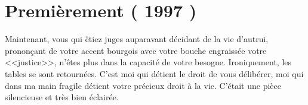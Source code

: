 \documentclass{article}
\begin{document}
    \section*{Premièrement ( 1997 ) }
        Maintenant, vous qui êtiez juges auparavant décidant de la vie d'autrui, prononçant de votre accent bourgois avec votre bouche engraissée votre <<justice>>,
        n'êtes plus dans la capacité de votre besogne. Ironiquement, les tables se sont retournées. C'est moi qui détient le droit de vous délibérer, moi qui dans 
        ma main fragile détient votre précieux droit à la vie. C'était une pièce silencieuse et très bien éclairée.
    
\end{document}
